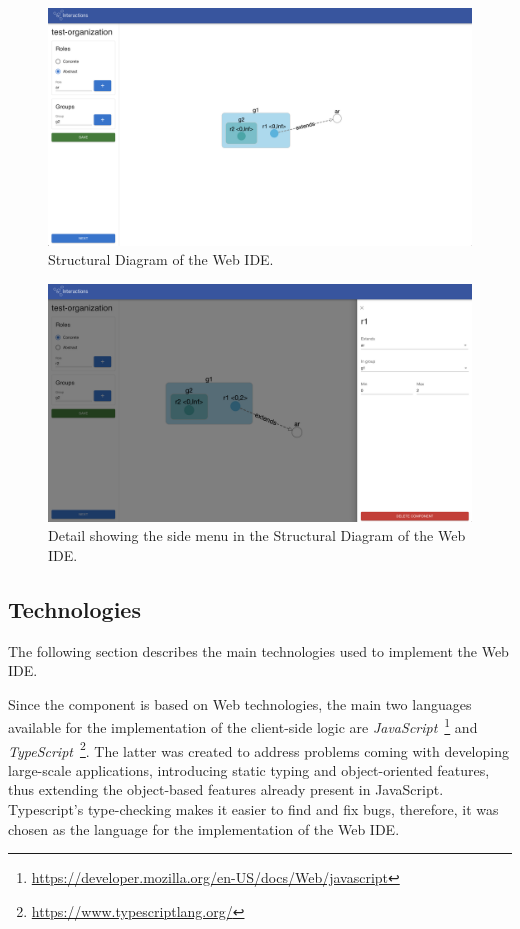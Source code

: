 \begin{figure}
    \centering
    \includegraphics[width=\linewidth]{images/ide/structural.png}
    \caption{Structural Diagram of the Web IDE.}
    \label{fig:ide-structural-all}
\end{figure}

\begin{figure}
    \centering
    \includegraphics[width=\linewidth]{images/ide/structural-side.png}
    \caption{Detail showing the side menu in the Structural Diagram of the Web IDE.}
    \label{fig:ide-structural-side}
\end{figure}

\subsection{Technologies}
The following section describes the main technologies used to implement the Web IDE.

Since the component is based on Web technologies, the main two languages available for the implementation of the client-side logic are \textit{JavaScript}~\footnote{\url{https://developer.mozilla.org/en-US/docs/Web/javascript}} and \textit{TypeScript}~\footnote{\url{https://www.typescriptlang.org/}}.
The latter was created to address problems coming with developing large-scale applications, introducing static typing and object-oriented features, thus extending the object-based features already present in JavaScript.
Typescript's type-checking makes it easier to find and fix bugs, therefore, it was chosen as the language for the implementation of the Web IDE.


